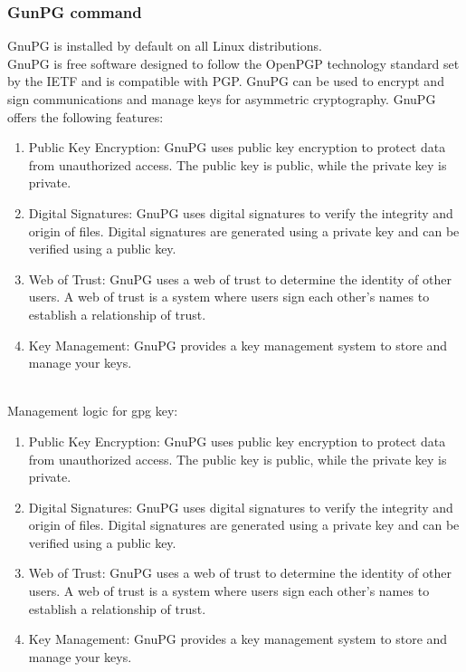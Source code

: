 \subsubsection{GunPG command}
GnuPG is installed by default on all Linux distributions.\cite{b40, b41}
\\
GnuPG is free software designed to follow the OpenPGP technology standard set by the 
IETF and is compatible with PGP. GnuPG can be used to encrypt and sign communications 
and manage keys for asymmetric cryptography. GnuPG offers the following features:
\begin{enumerate}[]
    \item Public Key Encryption: GnuPG uses public key encryption to protect data from unauthorized access. 
    The public key is public, while the private key is private.
    \item Digital Signatures: GnuPG uses digital signatures to verify the integrity and 
    origin of files. Digital signatures are generated using a private key and can be verified 
    using a public key.
    \item Web of Trust: GnuPG uses a web of trust to determine the identity of 
    other users. A web of trust is a system where users sign each other's names to 
    establish a relationship of trust.
    \item Key Management: GnuPG provides a key management system to store and manage your keys.
\end{enumerate}
\\
Management logic for gpg key:\cite{b40, b41}
\begin{enumerate}[]
    \item Public Key Encryption: GnuPG uses public key encryption to protect data from unauthorized access. 
    The public key is public, while the private key is private.
    \item Digital Signatures: GnuPG uses digital signatures to verify the integrity and 
    origin of files. Digital signatures are generated using a private key and can be verified 
    using a public key.
    \item Web of Trust: GnuPG uses a web of trust to determine the identity of 
    other users. A web of trust is a system where users sign each other's names to 
    establish a relationship of trust.
    \item Key Management: GnuPG provides a key management system to store and manage your keys.
\end{enumerate}

